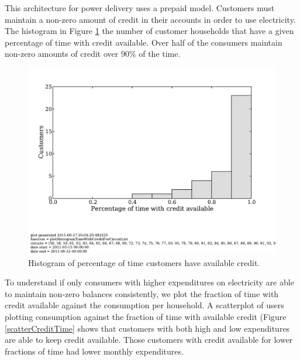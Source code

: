 \documentclass[conference]{IEEEtran}
\begin{document}

This architecture for power delivery uses a prepaid model.
Customers must maintain a non-zero amount of credit in their accounts in order
to use electricity.
The histogram in Figure \ref{creditHistogram} the number of customer households
that have a given percentage of time with credit available.
Over half of the consumers maintain non-zero amounts of credit over 90\% of
the time.


\begin{figure}[]
\begin{center}
\includegraphics[trim = 0in 1.3in 0in 0in, clip, width=\columnwidth]
                {figures/creditHistogram.pdf}
\end{center}
\caption{Histogram of percentage of time customers have available credit.}
\label{creditHistogram}
\end{figure}

To understand if only consumers with higher expenditures on electricity
are able to maintain non-zero balances consistently, we plot the fraction of
time with credit available against the consumption per household.
A scatterplot of users plotting consumption against the fraction of time with
available credit (Figure \ref{scatterCreditTime}
shows that customers with both high and low expenditures are able
to keep credit available.
Those customers with credit available for lower fractions of time had lower
monthly expenditures.
\end{document}
